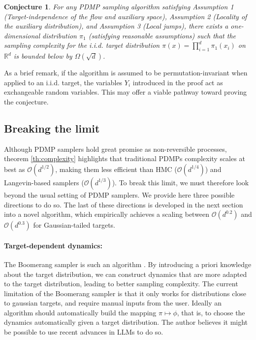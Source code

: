 \documentclass{article}
\newtheorem{conjecture}{Conjecture}
\begin{document}
\begin{conjecture}
    For any PDMP sampling algorithm satisfying Assumption 1 (Target-independence of the flow and auxiliary space), Assumption 2 (Locality of the auxiliary distribution), and Assumption 3 (Local jumps), there exists a one-dimensional distribution $\pi_1$ (satisfying reasonable assumptions) such that the sampling complexity for the i.i.d. target distribution $\pi(x) = \prod_{i=1}^d \pi_1(x_i)$ on $\mathbb{R}^d$ is bounded below by $\Omega(\sqrt{d})$. 
\end{conjecture}

As a brief remark, if the algorithm is assumed to be permutation-invariant when applied to an i.i.d. target, the variables $Y_i$ introduced in the proof act as exchangeable random variables. This may offer a viable pathway toward proving the conjecture.

\subsection{Breaking the limit}


Although PDMP samplers hold great promise as non-reversible processes, theorem \ref{th:complexity} highlights that traditional PDMPs complexity scales at best as $\mathcal{O}(d^{1/2})$, making them less efficient than HMC ($\mathcal{O}(d^{1/4})$) and Langevin-based samplers ($\mathcal{O}(d^{1/3})$).
To break this limit, we must therefore look beyond the usual setting of PDMP samplers. We provide here three possible directions to do so. The last of these directions is developed in the next section into a novel algorithm, which empirically achieves a scaling between $\mathcal{O}(d^{0.2})$ and $\mathcal{O}(d^{0.3})$ for Gaussian-tailed targets.

\paragraph{Target-dependent dynamics: } The Boomerang sampler is such an algorithm \cite{bierkens2020boomerang}. By introducing a priori knowledge about the target distribution, we can construct dynamics that are more adapted to the target distribution, leading to better sampling complexity. The current limitation of the Boomerang sampler is that it only works for distributions close to gaussian targets, and require manual inputs from the user. Ideally an algorithm should automatically build the mapping $\pi \mapsto \phi$, that is, to choose the dynamics automatically given a target distribution. The author believes it might be possible to use recent advances in LLMs to do so.
\end{document}
